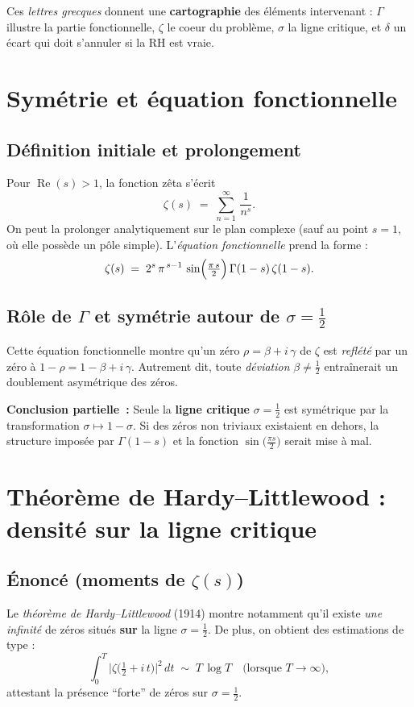 \documentclass[11pt]{article}
\begin{document}
Ces \emph{lettres grecques} donnent une \textbf{cartographie} des éléments intervenant : 
\(\Gamma\) illustre la partie fonctionnelle, \(\zeta\) le coeur du problème, \(\sigma\) la ligne critique, et \(\delta\) un écart qui doit s'annuler si la RH est vraie.

\section{Symétrie et équation fonctionnelle}
\label{sec:equation_fonctionnelle}

\subsection{Définition initiale et prolongement}
Pour \(\operatorname{Re}(s) > 1\), la fonction zêta s'écrit
\[
  \zeta(s) \;=\; \sum_{n=1}^{\infty}\,\frac{1}{n^s}.
\]
On peut la prolonger analytiquement sur le plan complexe (sauf au point \(s=1\), où elle possède un pôle simple). L'\emph{équation fonctionnelle} prend la forme :
\[
  \zeta(s)
  \;=\;
  2^s\,\pi^{\,s-1}\,
  \sin\Bigl(\tfrac{\pi\,s}{2}\Bigr)\,\Gamma(1-s)\,\zeta(1-s).
\]

\subsection{Rôle de \(\Gamma\) et symétrie autour de \(\sigma = \tfrac12\)}
Cette équation fonctionnelle montre qu'un zéro \(\rho = \beta + i\,\gamma\) de \(\zeta\) est \emph{reflété} par un zéro à \(1-\rho = 1-\beta + i\,\gamma\). Autrement dit, toute \emph{déviation} \(\beta\neq\tfrac12\) entraînerait un doublement asymétrique des zéros. 

\smallskip
\noindent
\textbf{Conclusion partielle~:} Seule la \textbf{ligne critique} \(\sigma=\tfrac12\) est symétrique par la transformation \(\sigma \mapsto 1-\sigma\). Si des zéros non triviaux existaient en dehors, la structure imposée par \(\Gamma(1-s)\) et la fonction \(\sin\bigl(\tfrac{\pi s}{2}\bigr)\) serait mise à mal.

\section{Théorème de Hardy--Littlewood : densité sur la ligne critique}
\label{sec:hardy_littlewood}

\subsection{Énoncé (moments de \(\zeta(s)\))}
Le \emph{théorème de Hardy--Littlewood} (1914) montre notamment qu'il existe \emph{une infinité} de zéros situés \textbf{sur} la ligne \(\sigma=\tfrac12\). De plus, on obtient des estimations de type :
\[
  \int_{0}^{T}
  \bigl|\zeta\bigl(\tfrac12 + i\,t\bigr)\bigr|^{2}\,dt
  \;\sim\;
  T\,\log T
  \quad \text{(lorsque } T\to\infty),
\]
attestant la présence ``forte'' de zéros sur \(\sigma=\tfrac12\).
\end{document}
